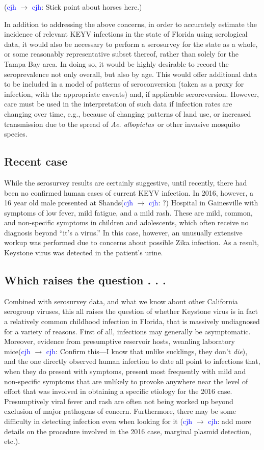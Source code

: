 \documentclass[12pt]{article}
\newcommand{\alb}{\textit{Ae. albopictus}}
\newcommand{\cjh}{\textcolor{blue}{cjh}}
\newcommand{\msg}[3]{(#1 $\rightarrow$ #2: #3)}
\newcommand{\mcc}[1]{\msg\cjh\cjh{#1}}
\begin{document}
        \mcc{Stick point about horses here.}

        In addition to addressing the above concerns, in order to accurately estimate the incidence of relevant KEYV infections in the state of Florida using serological data, it would also be necessary to perform a serosurvey for the state as a whole, or some reasonably representative subset thereof, rather than solely for the Tampa Bay area. In doing so, it would be highly desirable to record the seroprevalence not only overall, but also by age. This would offer additional data to be included in a model of patterns of seroconversion (taken as a proxy for infection, with the appropriate caveats) and, if applicable seroreversion. However, care must be used in the interpretation of such data if infection rates are changing over time, e.g., because of changing patterns of land use, or increased transmission due to the spread of \alb\ or other invasive mosquito species.

        \subsection{Recent case}
            While the serosurvey results are certainly suggestive, until recently, there had been no confirmed human cases of current KEYV infection. In 2016, however, a 16 year old male presented at Shands\mcc{?} Hospital in Gainesville with symptoms of low fever, mild fatigue, and a mild rash. These are mild, common, and non-specific symptoms in children and adolescents, which often receive no diagnosis beyond ``it's a virus.'' In this case, however, an unusually extensive workup was performed due to concerns about possible Zika infection. As a result, Keystone virus was detected in the patient's urine.\cite{asdf}
        

        \subsection{Which raises the question . . .}
            Combined with serosurvey data, and what we know about other California serogroup viruses, this all raises the question of whether Keystone virus is in fact a relatively common childhood infection in Florida, that is massively undiagnosed for a variety of reasons. First of all, infections may generally be asymptomatic. Moreover, evidence from presumptive reservoir hosts, weanling laboratory mice\mcc{Confirm this---I know that unlike sucklings, they don't \textit{die}}, and the one directly observed human infection to date all point to infections that, when they do present with symptoms, present most frequently with mild and non-specific symptoms that are unlikely to provoke anywhere near the level of effort that was involved in obtaining a specific etiology for the 2016 case. Presumptively viral fever and rash are often not being worked up beyond exclusion of major pathogens of concern. Furthermore, there may be some difficulty in detecting infection even when looking for it \mcc{add more details on the procedure involved in the 2016 case, marginal plasmid detection, etc.}.
\end{document}
